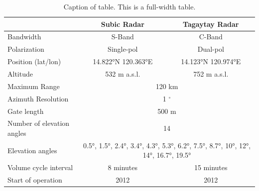 \begin{multicols}{2}
\begin{table}
\begin{center}
\caption{Caption of table. This is a full-width table.}
\begin{tabular}{@{}lcc@{}}
\toprule
                           & \multicolumn{1}{c}{Subic Radar}                  & \multicolumn{1}{c}{Tagaytay Radar}                 \\ \midrule
Bandwidth                  & S-Band                                           & C-Band                                             \\
Polarization               & Single-pol                                       & Dual-pol                                           \\
Position (lat/lon)         & 14.822°N 120.363°E                               & 14.123°N 120.974°E                                 \\
Altitude                   & 532 m a.s.l.                                     & 752 m a.s.l.                                       \\
Maximum Range              & \multicolumn{2}{c}{120 km}                                                                            \\
Azimuth Resolution         & \multicolumn{2}{c}{1 $^{\circ}$}                                                                      \\
Gate length                & \multicolumn{2}{c}{500 m}                                                                             \\
Number of elevation angles & \multicolumn{2}{c}{14}                                                                                \\
Elevation angles           & \multicolumn{2}{c}{0.5°, 1.5°, 2.4°, 3.4°, 4.3°, 5.3°, 6.2°, 7.5°, 8.7°, 10°, 12°, 14°, 16.7°, 19.5°} \\
Volume cycle interval      & 8 minutes                                        & 15 minutes                                         \\
Start of operation         & 2012                                             & 2012                                               \\ \bottomrule
\end{tabular}
\label{tab:SUBtechspecs}
\end{center}
\end{table}%


\end{multicols}

